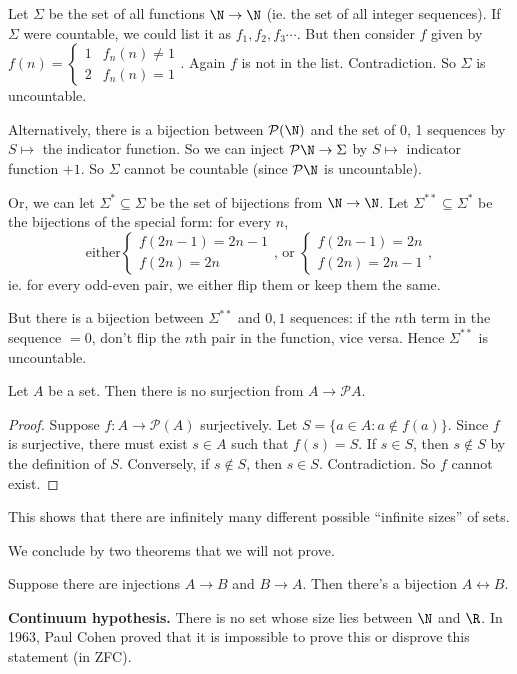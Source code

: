 \documentclass[a4paper]{article}
\begin{document}
\begin{eg}
  Let $\Sigma$ be the set of all functions $\N\to \N$ (ie. the set of all integer sequences). If $\Sigma$ were countable, we could list it as $f_1, f_2, f_3\cdots$. But then consider $f$ given by $f(n) =
  \begin{cases}
    1 & f_n(n) \not= 1\\
    2 & f_n(n) = 1
  \end{cases}$. Again $f$ is not in the list. Contradiction. So $\Sigma$ is uncountable.

  Alternatively, there is a bijection between $\mathcal{P}(\N)$ and the set of 0, 1 sequences by $S\mapsto$ the indicator function. So we can inject $\mathcal{P}\N \to \Sigma$ by $S\mapsto $ indicator function $+1$. So $\Sigma$ cannot be countable (since $\mathcal{P}\N$ is uncountable).

  Or, we can let $\Sigma^*\subseteq \Sigma$ be the set of bijections from $\N\to\N$. Let $\Sigma^{**}\subseteq \Sigma^*$ be the bijections of the special form: for every $n$,
  \[
    \text{either}
    \begin{cases}
      f(2n - 1) = 2n - 1\\
      f(2n) = 2n
    \end{cases}\text{, or }
    \begin{cases}
      f(2n - 1) = 2n\\
      f(2n) = 2n - 1
    \end{cases},
  \]
  ie. for every odd-even pair, we either flip them or keep them the same.

  But there is a bijection between $\Sigma^{**}$ and $0,1$ sequences: if the $n$th term in the sequence $ = 0$, don't flip the $n$th pair in the function, vice versa. Hence $\Sigma^{**}$ is uncountable.
\end{eg}

\begin{thm}
  Let $A$ be a set. Then there is no surjection from $A\to \mathcal{P}A$.
\end{thm}

\begin{proof}
  Suppose $f: A\to \mathcal{P}(A)$ surjectively. Let $S = \{a\in A: a\not\in f(a)\}$. Since $f$ is surjective, there must exist $s\in A$ such that $f(s) = S$. If $s\in S$, then $s\not\in S$ by the definition of $S$. Conversely, if $s\not\in S$, then $s\in S$. Contradiction. So $f$ cannot exist.
\end{proof}

This shows that there are infinitely many different possible ``infinite sizes'' of sets.

We conclude by two theorems that we will not prove.
\begin{thm}
  Suppose there are injections $A\to B$ and $B\to A$. Then there's a bijection $A\leftrightarrow B$.
\end{thm}

\noindent \textbf{Continuum hypothesis.} There is no set whose size lies between $\N$ and $\R$.
In 1963, Paul Cohen proved that it is impossible to prove this or disprove this statement (in ZFC).
\end{document}
